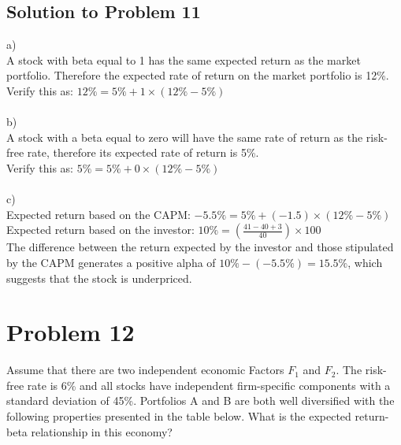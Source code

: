 \documentclass[12]{article}
\begin{document}
\subsection*{Solution to Problem 11}
a)\\
A stock with beta equal to 1 has the same expected return as the market portfolio. Therefore the expected rate of return on the market portfolio is 12\%.\\
Verify this as: $12\% = 5\% + 1\times (12\% -5\%)$\\
\\
b)\\
A stock with a beta equal to zero will have the same rate of return as the risk-free rate, therefore its expected rate of return is 5\%.\\
Verify this as: $5\% = 5\% + 0\times (12\% -5\%)$\\
\\
c)\\
Expected return based on the CAPM: $-5.5\% = 5\% + (-1.5)\times (12\% - 5\%)$\\\color{blue}
Expected return based on the investor: {\large $ 10\%= (\frac{41 - 40 + 3}{40})\times 100$}\\
The difference between the return expected by the investor and those stipulated by the CAPM generates a positive alpha of $10\% - (-5.5\%) = 15.5\%$,\color{blue} which suggests that the stock is underpriced.



\color{black}
\section*{Problem 12}
Assume that there are two independent economic Factors $F_1$ and $F_2$. The risk-free rate is 6\% and all stocks have independent firm-specific components with a standard deviation of 45\%. Portfolios A and B are both well diversified with the following properties presented in the table below. What is the expected return-beta relationship in this economy?

\begin{table}[H]
\centering
{}
\end{table}
\end{document}
